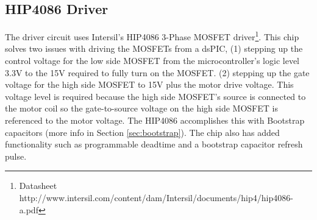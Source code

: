 \documentclass{article}
\begin{document}
\subsection{HIP4086 Driver}
The driver circuit uses Intersil's HIP4086 3-Phase MOSFET driver\footnote{Datasheet http://www.intersil.com/content/dam/Intersil/documents/hip4/hip4086-a.pdf}. This chip solves two issues with driving the MOSFETs from a dsPIC, (1) stepping up the control voltage for the low side MOSFET from the microcontroller's logic level 3.3V to the 15V required to fully turn on the MOSFET. (2) stepping up the gate voltage for the high side MOSFET to 15V plus the motor drive voltage. This voltage level is required because the high side MOSFET's source is connected to the motor coil so the gate-to-source voltage on the high side MOSFET is referenced to the motor voltage. The HIP4086 accomplishes this with Bootstrap capacitors (more info in Section \ref{sec:bootstrap}). The chip also has added functionality such as programmable deadtime and a bootstrap capacitor refresh pulse. 
\end{document}
